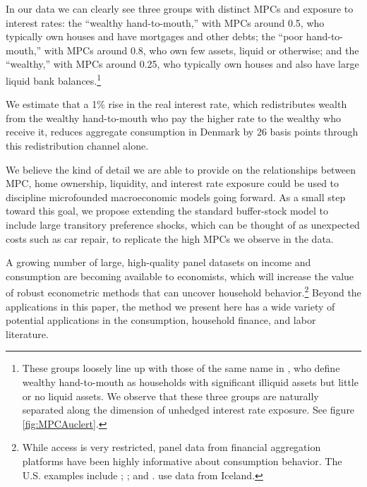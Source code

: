 \documentclass[titlepage]{\econtex}\newcommand{\texname}{ConsumptionHeterogeneity}
\begin{document}
In our data we can clearly see three groups with distinct MPCs and exposure to interest rates: the ``wealthy hand-to-mouth,'' with MPCs around 0.5, who typically own houses and have mortgages and other debts; the ``poor hand-to-mouth,'' with MPCs around 0.8, who own few assets, liquid or otherwise; and the ``wealthy,'' with MPCs around 0.25, who typically own houses and also have large liquid bank balances.\footnote{These groups loosely line up with those of the same name in \cite{violante_wealthy_2014}, who define wealthy hand-to-mouth as households with significant illiquid assets but little or no liquid assets. We observe that these three groups are naturally separated along the dimension of unhedged interest rate exposure. See figure \ref{fig:MPCAuclert}.}

We estimate that a 1\% rise in the real interest rate, which redistributes wealth from the wealthy hand-to-mouth who pay the higher rate to the wealthy who receive it, reduces aggregate consumption in Denmark by 26 basis points through this redistribution channel alone. 

We believe the kind of detail we are able to provide on the relationships between MPC, home ownership, liquidity, and interest rate exposure could be used to discipline microfounded macroeconomic models going forward. As a small step toward this goal, we propose extending the standard buffer-stock model to include large transitory preference shocks, which can be thought of as unexpected costs such as car repair, to replicate the high MPCs we observe in the data. 

A growing number of large, high-quality panel datasets on income and consumption are becoming available to economists, which will increase the value of robust econometric methods that can uncover household behavior.\footnote{While access is very restricted, panel data from financial aggregation platforms have been highly informative about consumption behavior. The U.S. examples include \cite{gelman_harnessing_2014}; \cite{ganong_consumer_2017}; and \cite{baker_debt_2015}. \cite{vardardottir_liquid_2016} use data from Iceland.} Beyond the applications in this paper, the method we present here has a wide variety of potential applications in the consumption, household finance, and labor literature.
\end{document}
